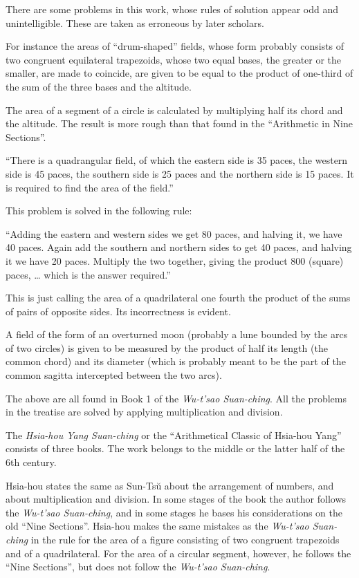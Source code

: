 \documentclass[11pt]{article}
\newcommand{\scanpage}[2]{\clearpage\setcounter{footnote}{0}\noindent{\footnotesize\color{gray}PDF page #1 · #2}\par\medskip}
\newcommand{\scanfooter}{}
\begin{document}
There are some problems in this work, whose rules of solution appear odd and unintelligible. These are taken as erroneous by later scholars.

For instance the areas of ``drum-shaped'' fields, whose form probably consists of two congruent equilateral trapezoids, whose two equal bases, the greater or the smaller, are made to coincide, are given to be equal to the product of one-third of the sum of the three bases and the altitude.

The area of a segment of a circle is calculated by multiplying half its chord and the altitude. The result is more rough than that found in the ``Arithmetic in Nine Sections''.

``There is a quadrangular field, of which the eastern side is 35 paces, the western side is 45 paces, the southern side is 25 paces and the northern side is 15 paces. It is required to find the area of the field.''

This problem is solved in the following rule:

``Adding the eastern and western sides we get 80 paces, and halving it, we have 40 paces. Again add the southern and northern sides to get 40 paces, and halving it we have 20 paces. Multiply the two together, giving the product 800 (square) paces, \ldots{} which is the answer required.''

This is just calling the area of a quadrilateral one fourth the product of the sums of pairs of opposite sides. Its incorrectness is evident.

A field of the form of an overturned moon (probably a lune bounded by the arcs of two circles) is given to be measured by the product of half its length (the common chord) and its diameter (which is probably meant to be the part of the common sagitta intercepted between the two arcs).
\scanfooter

\scanpage{0053}{Chapter 6, printed page 39}

The above are all found in Book 1 of the \emph{Wu-t'sao Suan-ching}. All the problems in the treatise are solved by applying multiplication and division.

The \emph{Hsia-hou Yang Suan-ching} or the ``Arithmetical Classic of Hsia-hou Yang'' consists of three books. The work belongs to the middle or the latter half of the 6th century.

Hsia-hou states the same as Sun-Tsŭ about the arrangement of numbers, and about multiplication and division. In some stages of the book the author follows the \emph{Wu-t'sao Suan-ching}, and in some stages he bases his considerations on the old ``Nine Sections''. Hsia-hou makes the same mistakes as the \emph{Wu-t'sao Suan-ching} in the rule for the area of a figure consisting of two congruent trapezoids and of a quadrilateral. For the area of a circular segment, however, he follows the ``Nine Sections'', but does not follow the \emph{Wu-t'sao Suan-ching}.
\end{document}
